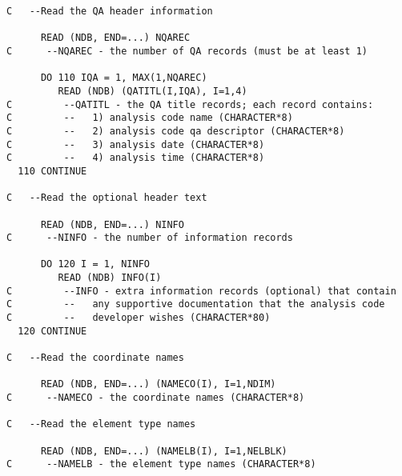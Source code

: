 \begin{verbatim}
C   --Read the QA header information

      READ (NDB, END=...) NQAREC
C      --NQAREC - the number of QA records (must be at least 1)

      DO 110 IQA = 1, MAX(1,NQAREC)
         READ (NDB) (QATITL(I,IQA), I=1,4)
C         --QATITL - the QA title records; each record contains:
C         --   1) analysis code name (CHARACTER*8)
C         --   2) analysis code qa descriptor (CHARACTER*8)
C         --   3) analysis date (CHARACTER*8)
C         --   4) analysis time (CHARACTER*8)
  110 CONTINUE

C   --Read the optional header text

      READ (NDB, END=...) NINFO
C      --NINFO - the number of information records

      DO 120 I = 1, NINFO
         READ (NDB) INFO(I)
C         --INFO - extra information records (optional) that contain
C         --   any supportive documentation that the analysis code
C         --   developer wishes (CHARACTER*80)
  120 CONTINUE

C   --Read the coordinate names

      READ (NDB, END=...) (NAMECO(I), I=1,NDIM)
C      --NAMECO - the coordinate names (CHARACTER*8)

C   --Read the element type names

      READ (NDB, END=...) (NAMELB(I), I=1,NELBLK)
C      --NAMELB - the element type names (CHARACTER*8)
\end{verbatim}
